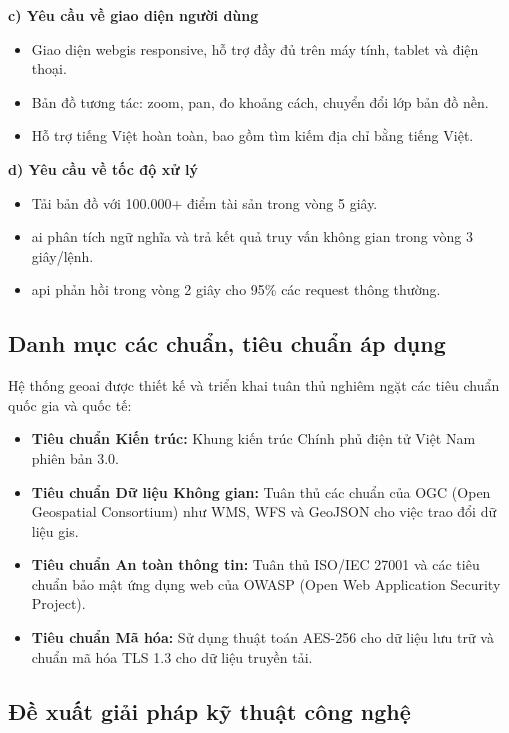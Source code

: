 \textbf{c) Yêu cầu về giao diện người dùng}
\begin{itemize}
    \item Giao diện \gls{webgis} responsive, hỗ trợ đầy đủ trên máy tính, tablet và điện thoại.
    \item Bản đồ tương tác: zoom, pan, đo khoảng cách, chuyển đổi lớp bản đồ nền.
    \item Hỗ trợ tiếng Việt hoàn toàn, bao gồm tìm kiếm địa chỉ bằng tiếng Việt.
\end{itemize}

\textbf{d) Yêu cầu về tốc độ xử lý}
\begin{itemize}
    \item Tải bản đồ với 100.000+ điểm tài sản trong vòng 5 giây.
    \item \gls{ai} phân tích ngữ nghĩa và trả kết quả truy vấn không gian trong vòng 3 giây/lệnh.
    \item \gls{api} phản hồi trong vòng 2 giây cho 95\% các request thông thường.
\end{itemize}

\subsection{Danh mục các chuẩn, tiêu chuẩn áp dụng}
Hệ thống \gls{geoai} được thiết kế và triển khai tuân thủ nghiêm ngặt các tiêu chuẩn quốc gia và quốc tế:
\begin{itemize}
    \item \textbf{Tiêu chuẩn Kiến trúc:} Khung kiến trúc Chính phủ điện tử Việt Nam phiên bản 3.0.
    \item \textbf{Tiêu chuẩn Dữ liệu Không gian:} Tuân thủ các chuẩn của OGC (Open Geospatial Consortium) như WMS, WFS và GeoJSON cho việc trao đổi dữ liệu \gls{gis}.
    \item \textbf{Tiêu chuẩn An toàn thông tin:} Tuân thủ ISO/IEC 27001 và các tiêu chuẩn bảo mật ứng dụng web của OWASP (Open Web Application Security Project).
    \item \textbf{Tiêu chuẩn Mã hóa:} Sử dụng thuật toán AES-256 cho dữ liệu lưu trữ và chuẩn mã hóa TLS 1.3 cho dữ liệu truyền tải.
\end{itemize}


\subsection{Đề xuất giải pháp kỹ thuật công nghệ}

